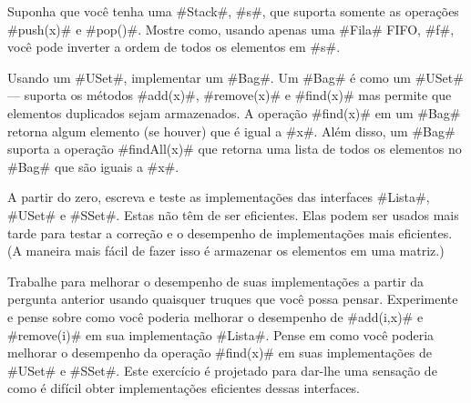 	\begin{exc}
		Suponha que você tenha uma #Stack#, #s#, que suporta somente as operações 
		#push(x)# e #pop()#. Mostre como, usando apenas uma #Fila# FIFO, #f#, você pode 
		inverter a ordem de todos os elementos em #s#.
	\end{exc}
	
	\begin{exc}
		Usando um #USet#, implementar um #Bag#. Um #Bag# é como um #USet# --- suporta os métodos #add(x)#, #remove(x)# e #find(x)# mas permite que elementos duplicados sejam 
		armazenados. A operação #find(x)# em um #Bag# retorna algum elemento (se houver) 
		que é igual a #x#. Além disso, um #Bag# suporta a operação #findAll(x)# 
		que retorna uma lista de todos os elementos no #Bag# que são iguais a #x#.
		\end{exc}
	
	\begin{exc}
		A partir do zero, escreva e teste as implementações das interfaces #Lista#, #USet# 
		e #SSet#. Estas não têm de ser eficientes. Elas podem ser usados mais tarde para testar a correção e o desempenho de implementações mais eficientes. (A maneira 
		mais fácil de fazer isso é armazenar os elementos em uma matriz.)
	\end{exc}
	
	\begin{exc}
		Trabalhe para melhorar o desempenho de suas implementações a partir da pergunta anterior usando quaisquer truques que você possa pensar. Experimente e pense sobre como você poderia melhorar o desempenho de #add(i,x)# e #remove(i)# em sua 
		implementação #Lista#. Pense em como você poderia melhorar o desempenho da operação 
		#find(x)# em suas implementações de #USet# e #SSet#. Este exercício é projetado para dar-lhe uma sensação de como é difícil obter implementações eficientes dessas 
		interfaces.
	\end{exc}
	
	
	
	
	
